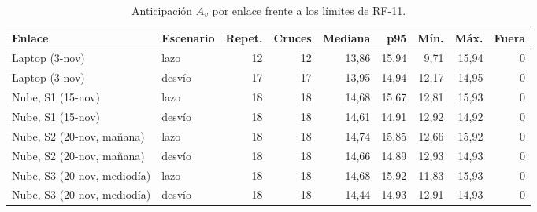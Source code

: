 \begin{table}[H]
\centering
\caption{Anticipación $A_v$ por enlace frente a los límites de RF-11.}
\label{tab:anticipacion_parada}
\small
\begin{tabular}{llrrrrrrr}
\toprule
\textbf{Enlace} & \textbf{Escenario} & \textbf{Repet.} & \textbf{Cruces} & \textbf{Mediana} & \textbf{p95} & \textbf{Mín.} & \textbf{Máx.} & \textbf{Fuera} \\
\midrule
Laptop (3-nov) & lazo & 12 & 12 & 13,86 & 15,94 & 9,71 & 15,94 & 0 \\
Laptop (3-nov) & desvío & 17 & 17 & 13,95 & 14,94 & 12,17 & 14,95 & 0 \\
Nube, S1 (15-nov) & lazo & 18 & 18 & 14,68 & 15,67 & 12,81 & 15,93 & 0 \\
Nube, S1 (15-nov) & desvío & 18 & 18 & 14,61 & 14,91 & 12,92 & 14,92 & 0 \\
Nube, S2 (20-nov, mañana) & lazo & 18 & 18 & 14,74 & 15,85 & 12,66 & 15,92 & 0 \\
Nube, S2 (20-nov, mañana) & desvío & 18 & 18 & 14,66 & 14,89 & 12,93 & 14,93 & 0 \\
Nube, S3 (20-nov, mediodía) & lazo & 18 & 18 & 14,68 & 15,92 & 11,83 & 15,93 & 0 \\
Nube, S3 (20-nov, mediodía) & desvío & 18 & 18 & 14,44 & 14,93 & 12,91 & 14,93 & 0 \\
\bottomrule
\end{tabular}
\par{}
\end{table}
